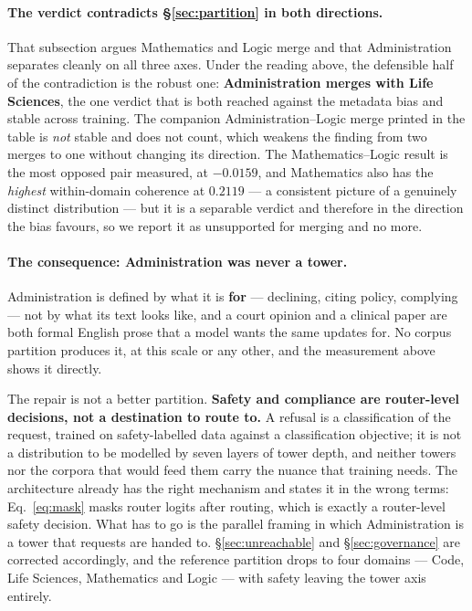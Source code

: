 \documentclass[11pt]{article}
\begin{document}
\paragraph{The verdict contradicts \S\ref{sec:partition} in both directions.} That subsection argues Mathematics and Logic merge and that Administration separates cleanly on all three axes. Under the reading above, the defensible half of the contradiction is the robust one: \textbf{Administration merges with Life Sciences}, the one verdict that is both reached against the metadata bias and stable across training. The companion Administration--Logic merge printed in the table is \emph{not} stable and does not count, which weakens the finding from two merges to one without changing its direction. The Mathematics--Logic result is the most opposed pair measured, at $-0.0159$, and Mathematics also has the \emph{highest} within-domain coherence at $0.2119$ --- a consistent picture of a genuinely distinct distribution --- but it is a separable verdict and therefore in the direction the bias favours, so we report it as unsupported for merging and no more.

\paragraph{The consequence: Administration was never a tower.} Administration is defined by what it is \textbf{for} --- declining, citing policy, complying --- not by what its text looks like, and a court opinion and a clinical paper are both formal English prose that a model wants the same updates for. No corpus partition produces it, at this scale or any other, and the measurement above shows it directly.

The repair is not a better partition. \textbf{Safety and compliance are router-level decisions, not a destination to route to.} A refusal is a classification of the request, trained on safety-labelled data against a classification objective; it is not a distribution to be modelled by seven layers of tower depth, and neither towers nor the corpora that would feed them carry the nuance that training needs. The architecture already has the right mechanism and states it in the wrong terms: Eq.~\eqref{eq:mask} masks router logits after routing, which is exactly a router-level safety decision. What has to go is the parallel framing in which Administration is a tower that requests are handed to. \S\ref{sec:unreachable} and \S\ref{sec:governance} are corrected accordingly, and the reference partition drops to four domains --- Code, Life Sciences, Mathematics and Logic --- with safety leaving the tower axis entirely.
\end{document}
